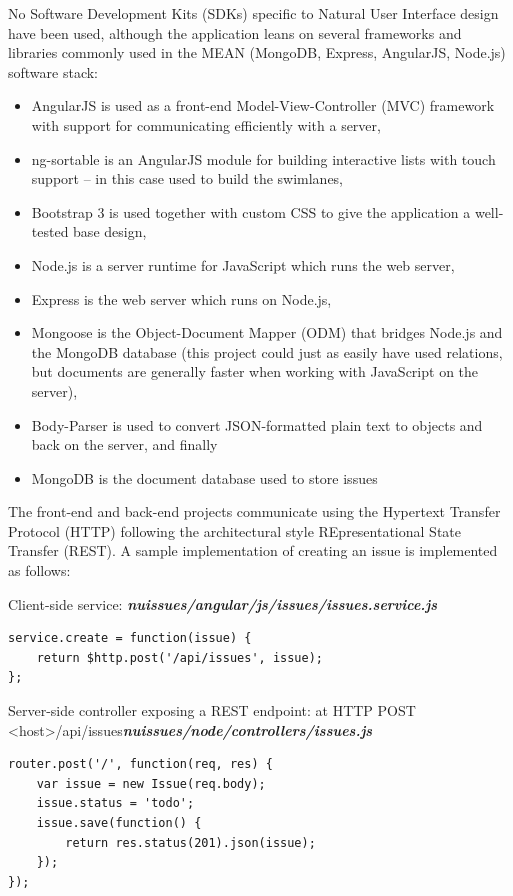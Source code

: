 No Software Development Kits (SDKs) specific to Natural User Interface design have been used, although the application leans on several frameworks and libraries commonly used in the MEAN (MongoDB, Express, AngularJS, Node.js) software stack:

\begin{itemize}
  \item AngularJS is used as a front-end Model-View-Controller (MVC) framework with support for communicating efficiently with a server,
  \item ng-sortable is an AngularJS module for building interactive lists with touch support -- in this case used to build the swimlanes,
  \item Bootstrap 3 is used together with custom CSS to give the application a well-tested base design,
  \item Node.js is a server runtime for JavaScript which runs the web server,
  \item Express is the web server which runs on Node.js,
  \item Mongoose is the Object-Document Mapper (ODM) that bridges Node.js and the MongoDB database (this project could just as easily have used relations, but documents are generally faster when working with JavaScript on the server),
  \item Body-Parser is used to convert JSON-formatted plain text to objects and back on the server, and finally
  \item MongoDB is the document database used to store issues
\end{itemize}

The front-end and back-end projects communicate using the Hypertext Transfer Protocol (HTTP) following the architectural style REpresentational State Transfer (REST). A sample implementation of creating an issue is implemented as follows:

Client-side service: \textbf{\textit{nuissues/angular/js/issues/issues.service.js}}
\begin{lstlisting}
service.create = function(issue) {
    return $http.post('/api/issues', issue);
};
\end{lstlisting}

Server-side controller exposing a REST endpoint: at HTTP POST <host>/api/issues\textbf{\textit{nuissues/node/controllers/issues.js}}
\begin{lstlisting}
router.post('/', function(req, res) {
	var issue = new Issue(req.body);
	issue.status = 'todo';
	issue.save(function() {
		return res.status(201).json(issue);
	});
});
\end{lstlisting}

